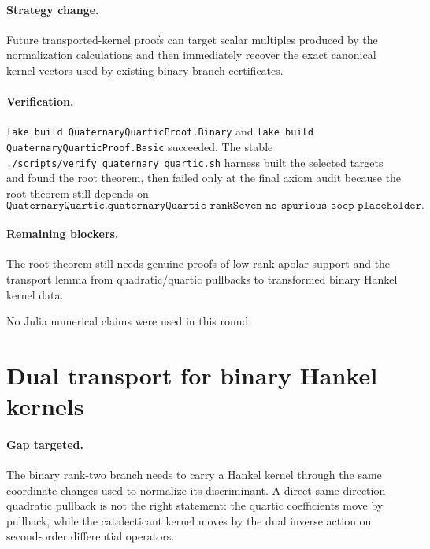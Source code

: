 \documentclass[11pt]{article}
\begin{document}
\paragraph{Strategy change.}
Future transported-kernel proofs can target scalar multiples produced by the
normalization calculations and then immediately recover the exact canonical
kernel vectors used by existing binary branch certificates.

\paragraph{Verification.}
\texttt{lake build QuaternaryQuarticProof.Binary} and
\texttt{lake build QuaternaryQuarticProof.Basic} succeeded.  The stable
\texttt{./scripts/verify\_quaternary\_quartic.sh} harness built the selected
targets and found the root theorem, then failed only at the final axiom audit
because the root theorem still depends on
\[
\texttt{QuaternaryQuartic.quaternaryQuartic\_rankSeven\_no\_spurious\_socp\_placeholder}.
\]

\paragraph{Remaining blockers.}
The root theorem still needs genuine proofs of low-rank apolar support and the
transport lemma from quadratic/quartic pullbacks to transformed binary Hankel
kernel data.

No Julia numerical claims were used in this round.

\section*{Dual transport for binary Hankel kernels}

\paragraph{Gap targeted.}
The binary rank-two branch needs to carry a Hankel kernel through the same
coordinate changes used to normalize its discriminant.  A direct same-direction
quadratic pullback is not the right statement: the quartic coefficients move by
pullback, while the catalecticant kernel moves by the dual inverse action on
second-order differential operators.
\end{document}

